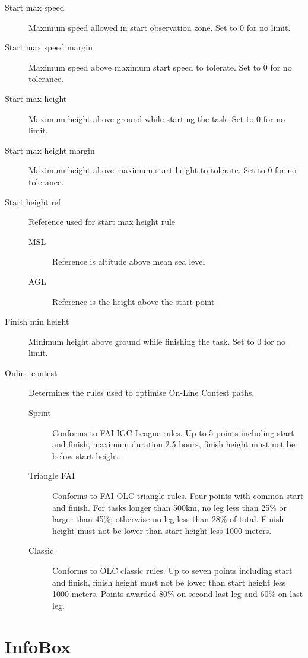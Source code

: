 \documentclass[a4paper,12pt]{refrep}
\newcommand{\InfoBox}[0]{{InfoBox}}
\begin{document}
\begin{description}
\item[Start max speed]  Maximum speed allowed in start observation zone.  Set to 0 for no limit.
\item[Start max speed margin] Maximum speed above maximum start speed to tolerate.  Set to 0 for no tolerance.
\item[Start max height]  Maximum height above ground while starting the task.  Set to 0 for no limit.
\item[Start max height margin]  Maximum height above maximum start height to tolerate.  Set to 0 for no tolerance.
\item[Start height ref]  Reference used for start max height rule
\begin{description}
\item[MSL] Reference is altitude above mean sea level
\item[AGL] Reference is the height above the start point
\end{description}
\item[Finish min height]  Minimum height above ground while finishing the task.  Set to 0 for no limit. 
\item[Online contest] Determines the rules used to optimise On-Line Contest paths. 
\begin{description}
\item[Sprint]  Conforms to FAI IGC League rules.  Up to 5 points including start and finish, maximum duration 2.5 hours, finish height must not be below start height.
\item[Triangle FAI]  Conforms to FAI OLC triangle rules.  Four points with common start and finish.  For tasks longer than 500km, no leg less than 25\% or larger than 45\%; otherwise no leg less than 28\% of total.  Finish height must not be lower than start height less 1000 meters.
\item[Classic]  Conforms to OLC classic rules.  Up to seven points including start and finish, finish height must not be lower than start height less 1000 meters.  Points awarded 80\% on second last leg and 60\% on last leg.
\end{description}
\end{description}

\clearpage
\section{{\InfoBox}}
\end{document}
